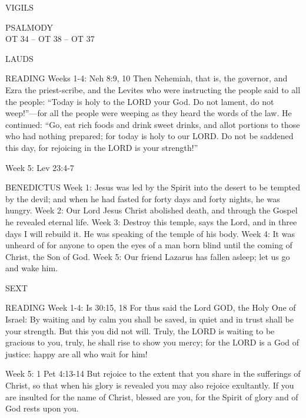 \begin{flushleft}\normalsize{\uppercase{VIGILS\\}}\end{flushleft}
\noindent\small{\uppercase{PSALMODY}\\}
\uppercase{OT 34 -- OT 38 -- OT 37}\vspace{0.5em}\\

\begin{flushleft}\normalsize{\uppercase{LAUDS\\}}\end{flushleft}
READING
Weeks 1-4:    Neh 8:9, 10    Then Nehemiah, that is, the governor, and Ezra the priest-scribe, and the Levites who were instructing the people said to all the people: “Today is holy to the LORD your God. Do not lament, do not weep!”—for all the people were weeping as they heard the words of the law. He continued: “Go, eat rich foods and drink sweet drinks, and allot portions to those who had nothing prepared; for today is holy to our LORD. Do not be saddened this day, for rejoicing in the LORD is your strength!” 

Week 5:  Lev 23:4-7  

BENEDICTUS
Week 1:	Jesus was led by the Spirit into the desert to be tempted by the devil; and when he had fasted for forty days and forty nights, he was hungry.
Week 2:	Our Lord Jesus Christ abolished death, and through the Gospel he revealed eternal life.
Week 3:	Destroy this temple, says the Lord, and in three days I will rebuild it. He was speaking of the temple of his body.
Week 4:	It was unheard of for anyone to open the eyes of a man born blind until the coming of Christ, the Son of God.
Week 5:	Our friend Lazarus has fallen asleep; let us go and wake him.

\begin{flushleft}\normalsize{\uppercase{SEXT\\}}\end{flushleft}
READING
Week 1-4:  Is 30:15, 18  For thus said the Lord GOD, the Holy One of Israel: By waiting and by calm you shall be saved, in quiet and in trust shall be your strength. But this you did not will. Truly, the LORD is waiting to be gracious to you, truly, he shall rise to show you mercy; for the LORD is a God of justice: happy are all who wait for him!

Week 5:  1 Pet 4:13-14  But rejoice to the extent that you share in the sufferings of Christ, so that when his glory is revealed you may also rejoice exultantly. If you are insulted for the name of Christ, blessed are you, for the Spirit of glory and of God rests upon you.

